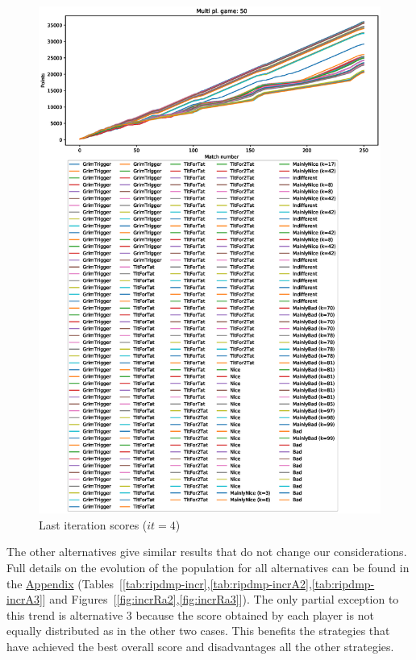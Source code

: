 \documentclass[journal,10pt,twoside]{IEEEtran}
\begin{document}
\begin{figure}[!ht]
    \centering
    \includegraphics[width=1\columnwidth]{../img/ripdmp-incr/alt1/ripdmp-scores-increasing-pop-50-r4}
    \caption{Last iteration scores ($it=4$)}
    \label{fig:incrLI}
\end{figure}

The other alternatives give similar results that do not change our considerations. Full details on the evolution of the population for all alternatives can be found in the \hyperref[s:appendix]{Appendix} (Tables~[\ref{tab:ripdmp-incr},\ref{tab:ripdmp-incrA2},\ref{tab:ripdmp-incrA3}] and Figures~[\ref{fig:incrRa2},\ref{fig:incrRa3}]). The only partial exception to this trend is alternative 3 because the score obtained by each player is not equally distributed as in the other two cases. This benefits the strategies that have achieved the best overall score and disadvantages all the other strategies.
\end{document}
